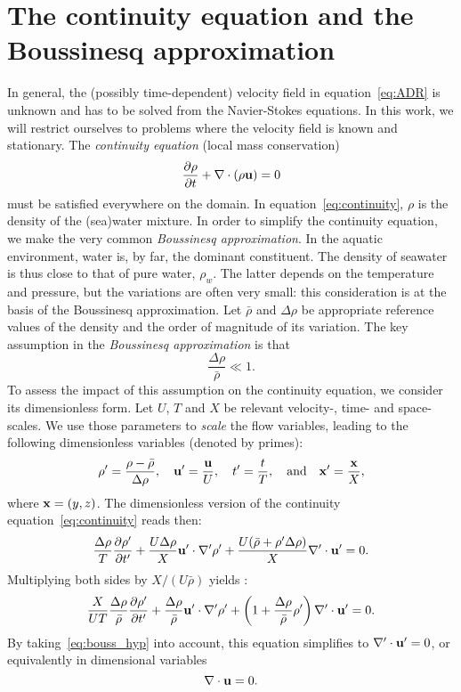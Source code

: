 \section{The continuity equation and the Boussinesq approximation}
In general, the (possibly time-dependent) velocity field in equation~\eqref{eq:ADR} is unknown and has to be solved from the Navier-Stokes equations. In this work, we will restrict ourselves to problems where the velocity field is known and stationary. The \textit{continuity equation} (local mass conservation)
\begin{equation} \label{eq:continuity}
	\frac{\partial \rho}{\partial t} + \nabla \cdot (\rho \mathbf u) = 0
\end{equation}
must be satisfied everywhere on the domain. In equation~\eqref{eq:continuity}, $\rho$ is the density of the (sea)water mixture. In order to simplify the continuity equation, we make the very common \textit{Boussinesq approximation}. In the aquatic environment, water is, by far, the dominant constituent. The density of seawater is thus close to that of pure water, $\rho_w$. The latter depends on the temperature and pressure, but the variations are often very small: this consideration is at the basis of the Boussinesq approximation. Let $\bar{\rho}$ and $\Delta\rho$ be appropriate reference values of the density and the order of magnitude of its variation. The key assumption in the \textit{Boussinesq approximation} is that
\begin{equation} \label{eq:bouss_hyp}
	\frac{\Delta \rho}{\bar{\rho}} \ll 1.
\end{equation}
To assess the impact of this assumption on the continuity equation, we consider its dimensionless form. Let $U$, $T$ and $X$ be relevant velocity-, time- and space-scales. We use those parameters to \textit{scale} the flow variables, leading to the following dimensionless variables (denoted by primes):
\begin{equation}
	\rho' = \frac{\rho - \bar{\rho}}{\Delta \rho}, \quad \mathbf u' = \frac{\mathbf u}{U}, \quad t' = \frac{t}{T}, \quad \mbox{and} \quad \mathbf x' = \frac{\mathbf x}{X},
\end{equation}
where $\mathbf x = (y,z)$. The dimensionless version of the continuity equation~\eqref{eq:continuity} reads then: 
\begin{equation}
	\frac{\Delta \rho}{T}\frac{\partial \rho'}{\partial t'} + \frac{U\Delta \rho}{X}\mathbf u' \cdot \nabla' \rho' + \frac{U(\bar{\rho}+ \rho' \Delta \rho)}{X}\nabla' \cdot \mathbf u' = 0.
\end{equation}
Multiplying both sides by $X/(U\bar{\rho})$ yields :
\begin{equation}
	\frac{X}{UT}\frac{\Delta \rho}{\bar{\rho}}\frac{\partial \rho'}{\partial t'} + \frac{\Delta \rho}{\bar{\rho}}\mathbf u' \cdot \nabla' \rho' + \left(1+\frac{\Delta \rho}{\bar{\rho}}\rho'\right)\nabla' \cdot \mathbf u' = 0.
\end{equation}
By taking~\eqref{eq:bouss_hyp} into account, this equation simplifies to $\nabla' \cdot \mathbf u' = 0$, or equivalently in dimensional variables 
\begin{equation}
	\nabla \cdot \mathbf u = 0.
\end{equation}

